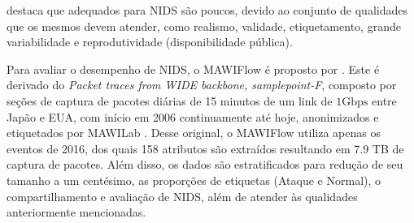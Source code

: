 



 destaca que \datasets adequados para NIDS são
poucos, devido ao conjunto de qualidades que os mesmos devem atender, como
realismo, validade, etiquetamento, grande variabilidade e reprodutividade
(disponibilidade pública).

Para avaliar o desempenho de NIDS, o \dataset MAWIFlow é proposto por .
Este \dataset é derivado do
\dataset \emph{Packet traces from WIDE backbone, samplepoint-F}, composto por
seções de captura de pacotes diárias de 15 minutos de um link de $1
\mathrm{Gbps}$ entre Japão e EUA, com início em 2006 continuamente até hoje,
anonimizados e etiquetados por MAWILab \cite{mawiSamplepointF,Fontugne2010}.
Desse \dataset original, o \dataset MAWIFlow utiliza apenas os eventos de 2016,
dos quais 158 atributos são extraídos resultando em 7.9 TB de captura de pacotes.
Além disso, os dados são estratificados para redução de seu tamanho a um
centésimo,  as proporções de etiquetas (Ataque e Normal),  o
compartilhamento e avaliação de NIDS, além de atender às qualidades anteriormente
mencionadas.

